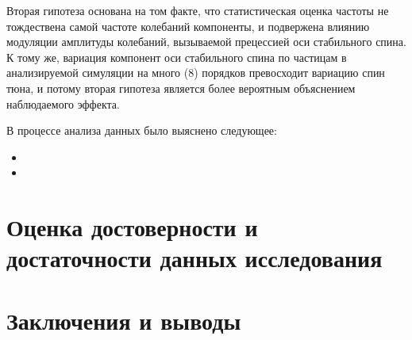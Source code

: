 \documentclass{report}
\begin{document}
Вторая гипотеза основана на том факте, что статистическая оценка частоты не тождествена самой частоте колебаний компоненты, и подвержена влиянию модуляции амплитуды колебаний, вызываемой прецессией оси стабильного спина. К тому же, вариация компонент оси стабильного спина по частицам в анализируемой симуляции на много (8) порядков превосходит вариацию спин тюна, и потому вторая гипотеза является более вероятным объяснением наблюдаемого эффекта.

В процессе анализа данных было выяснено следующее:
\begin{itemize}
\item 
\item
\end{itemize}

\chapter{Оценка достоверности и достаточности данных исследования}

\chapter{Заключения и выводы}

%
%
\end{document}
